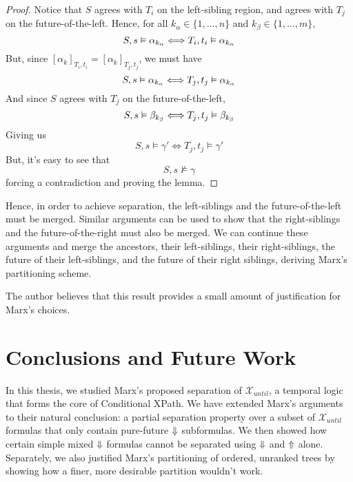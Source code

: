 \documentclass[a4paper,UKenglish,cleveref, autoref, thm-restate, numberwithinsect]{lipics-v2021}
\def\Uarrow{\ensuremath\mathord{\Uparrow}}
\def\Darrow{\ensuremath\mathord{\Downarrow}}
\begin{document}
\begin{proof}
    Notice that $S$ agrees with $T_i$ on the left-sibling region, and agrees with $T_j$ on the future-of-the-left. Hence, for all $k_\alpha \in \{1, \ldots, n\}$ and $k_\beta \in \{1, \ldots, m\}$,
    \begin{equation*}
        S, s \vDash \alpha_{k_\alpha} \Longleftrightarrow T_i, t_i \vDash \alpha_{k_\alpha}\\
    \end{equation*}
    But, since $[\alpha_k]_{T_i, t_i} = [\alpha_k]_{T_j, t_j}$, we must have
    \begin{equation*}
        S, s \vDash \alpha_{k_\alpha} \Longleftrightarrow T_j, t_j \vDash \alpha_{k_\alpha}\\
    \end{equation*}
    And since $S$ agrees with $T_j$ on the future-of-the-left,
    \begin{equation*}
        S, s \vDash \beta_{k_\beta} \Longleftrightarrow T_j, t_j \vDash \beta_{k_\beta}\\
    \end{equation*}
    Giving us
    \begin{equation*}
        S, s \vDash \gamma' \Longleftrightarrow T_j, t_j \vDash \gamma'
    \end{equation*}
    But, it's easy to see that
    \begin{equation*}
        S, s \nvDash \gamma
    \end{equation*}
    forcing a contradiction and proving the lemma.
\end{proof}
Hence, in order to achieve separation, the left-siblings and the future-of-the-left must be merged. Similar arguments can be used to show that the right-siblings and the future-of-the-right must also be merged. We can continue these arguments and merge the ancestors, their left-siblings, their right-siblings, the future of their left-siblings, and the future of their right siblings, deriving Marx's partitioning scheme.

The author believes that this result provides a small amount of justification for Marx's choices.

\section{Conclusions and Future Work}
\label{sec:conclusions}
In this thesis, we studied Marx's proposed separation of $\mathcal{X}_{until}$, a temporal logic that forms the core of Conditional XPath. We have extended Marx's arguments to their natural conclusion: a partial separation property over a subset of $\mathcal{X}_{until}$ formulas that only contain pure-future $\Darrow$ subformulas. We then showed how certain simple mixed $\Darrow$ formulas cannot be separated using $\Darrow$ and $\Uarrow$ alone. Separately, we also justified Marx's partitioning of ordered, unranked trees by showing how a finer, more desirable partition wouldn't work.
\end{document}
